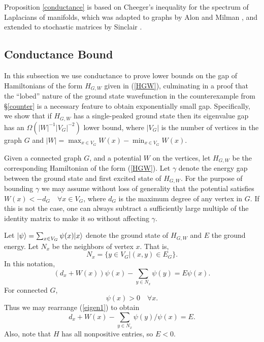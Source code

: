 Proposition \ref{conductance} is based on Cheeger's inequality
\cite{Cheeger} for the spectrum of Laplacians of manifolds, which was
adapted to graphs by Alon and Milman \cite{Alon}, and extended to
stochastic matrices by Sinclair \cite{Sinclair}.

\subsection{Conductance Bound}
\label{sec:general}

In this subsection we use conductance to prove lower bounds on the gap
of Hamiltonians of the form $H_{G,W}$ given in (\ref{HGW}),
culminating in a proof that the ``lobed'' nature of the ground state
wavefunction in the counterexample from \S \ref{counter} is a
necessary feature to obtain exponentially small gap. Specifically, we
show that if $H_{G,W}$ has a single-peaked ground state then its
eigenvalue gap has an $\Omega(|W|^{-1} |V_G|^{-2})$ lower bound, where
$|V_G|$ is the number of vertices in the graph $G$ and $|W| =
\max_{x\in V_G} W(x) - \min_{x \in V_G} W(x)$.

Given a connected graph $G$, and a potential $W$ on the vertices, let
$H_{G,W}$ be the corresponding Hamiltonian of the form (\ref{HGW}).
Let $\gamma$ denote the energy gap between the ground state and first
excited state of $H_{G,W}$. For the purpose of bounding $\gamma$ we
may assume without loss of generality that the potential satisfies
$W(x) < -d_G \quad \forall x \in V_G$, where $d_G$ is the maximum degree
of any vertex in $G$. If this is not the case, one can always
subtract a sufficiently large multiple of the identity matrix to make
it so without affecting $\gamma$.

Let $|\psi\rangle = \sum_{x \in V_G} \psi(x) |x\rangle$ denote the ground
state of $H_{G,W}$ and $E$ the ground energy. Let $N_x$ be the
neighbors of vertex $x$. That is, 
\begin{equation}
N_x = \{ y \in V_G| (x,y) \in E_G\}.
\end{equation}
In this notation,
\begin{equation}
\label{eigen1}
 (d_x +W(x)) \psi(x) - \sum_{y \in N_x} \psi(y) = E \psi(x).
\end{equation}
For connected $G$, 
\begin{equation}
\label{strictly}
\psi(x) > 0 \quad \forall x.
\end{equation}
Thus we may rearrange
(\ref{eigen1}) to obtain
\begin{equation}
\label{eigen2}
d_x + W(x) -\sum_{y \in N_x} \psi(y)/\psi(x)  = E.
\end{equation}
Also, note that $H$ has all nonpositive entries, so $E < 0$. 

